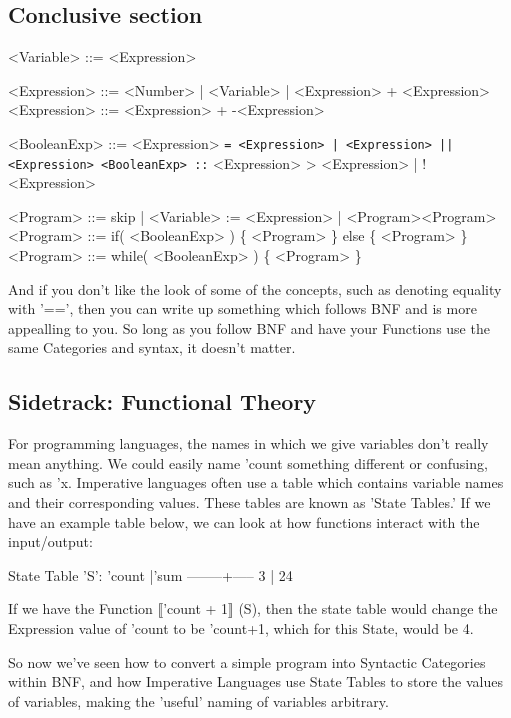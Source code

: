 \documentclass[12pt]{article}
\begin{document}
\subsection{Conclusive section}
\label{sec-3-7}
<Variable>   ::= <Expression>

<Expression> ::= <Number> | <Variable> | <Expression> + <Expression>
<Expression> ::= <Expression> + -<Expression>

<BooleanExp> ::= <Expression> \texttt{= <Expression> | <Expression> || <Expression>
<BooleanExp> ::} <Expression> >  <Expression> | !<Expression>

<Program> ::= skip | <Variable> := <Expression> | <Program><Program>
<Program> ::= if( <BooleanExp> ) \{ <Program> \} else \{ <Program> \}
<Program> ::= while( <BooleanExp> ) \{ <Program> \}

And if you don't like the look of some of the concepts, such as denoting
equality with '==', then you can write up something which follows BNF and is
more appealling to you.  So long as you follow BNF and have your Functions
use the same Categories and syntax, it doesn't matter.

\subsection{Sidetrack: Functional Theory}
\label{sec-3-8}
For programming languages, the names in which we give variables don't really
mean anything.  We could easily name 'count something different or confusing,
such as 'x.  Imperative languages often use a table which contains variable
names and their corresponding values.  These tables are known as 'State
Tables.'  If we have an example table below, we can look at how functions
interact with the input/output:

State Table 'S':
'count  |'sum
--------+-----
   3    | 24


If we have the Function
⟦'count + 1⟧           (S), then the state table would change the
           Expression
value of 'count to be 'count+1, which for this State, would be 4.

So now we've seen how to convert a simple program into Syntactic Categories
within BNF, and how Imperative Languages use State Tables to store the values
of variables, making the 'useful' naming of variables arbitrary.
\end{document}
